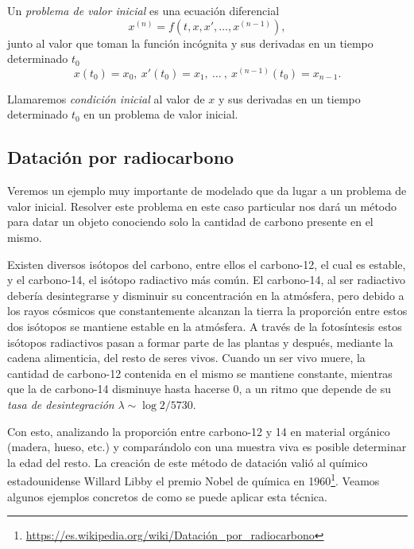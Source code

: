 \documentclass[../ecuaciones_diferenciales.tex]{subfiles}
\begin{document}
\begin{definition}
	Un \emph{problema de valor inicial} es una ecuación diferencial
	\[x^{(n)} = f(t, x, x', \dots, x^{(n - 1)}),\]
	junto al valor que toman la función incógnita y sus derivadas en un tiempo
	determinado \(t_0\)
	\[x(t_0) = x_0,\ x'(t_0) = x_1,\ \dots\ ,\ x^{(n - 1)}(t_0) = x_{n - 1}.\]
\end{definition}

\begin{definition}
	Llamaremos \emph{condición inicial} al valor de \(x\) y sus derivadas en un
	tiempo determinado \(t_0\) en un problema de valor inicial.
\end{definition}

\subsection{Datación por radiocarbono}

Veremos un ejemplo muy importante de modelado que da lugar a un problema de
valor inicial. Resolver este problema en este caso particular nos dará un método
para datar un objeto conociendo solo la cantidad de carbono presente en el mismo.

Existen diversos isótopos del carbono, entre ellos el carbono-12, el cual es
estable, y el carbono-14, el isótopo radiactivo más común. El carbono-14, al ser
radiactivo debería desintegrarse y disminuir su concentración en la atmósfera,
pero debido a los rayos cósmicos que constantemente alcanzan la tierra la
proporción entre estos dos isótopos se mantiene estable en la atmósfera. A
través de la fotosíntesis estos isótopos radiactivos pasan a formar parte de las
plantas y después, mediante la cadena alimenticia, del resto de seres vivos.
Cuando un ser vivo muere, la cantidad de carbono-12 contenida en el mismo se
mantiene constante, mientras que la de carbono-14 disminuye hasta hacerse 0,
a un ritmo que depende de su \emph{tasa de desintegración}
\(\lambda \sim \log 2 / 5730\).

Con esto, analizando la proporción entre carbono-12 y 14 en
material orgánico (madera, hueso, etc.) y comparándolo con una muestra viva es
posible determinar la edad del resto. La creación de este método de
datación valió al químico estadounidense Willard Libby el premio Nobel de
química en
1960\footnote{\url{https://es.wikipedia.org/wiki/Datación_por_radiocarbono}}.
Veamos algunos ejemplos concretos de como se puede aplicar esta
técnica.
\end{document}
